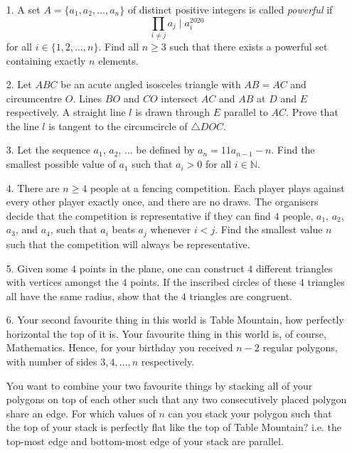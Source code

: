 \documentclass{article}
\begin{document}
\begin{enumerate}

\bigskip
\item[1.] %
A set $A = \{a_1, a_2, \dotsc, a_n\}$ of distinct positive integers is called \emph{powerful} if
\[ \prod_{i \neq j} a_j \mid a_i^{2020} \]
for all $i \in \{1, 2, \dotsc, n\}$.
Find all $n \ge 3$ such that there exists a powerful set containing exactly $n$ elements.


\medskip
\item[2.] %
Let $ABC$ be an acute angled isosceles triangle with $AB = AC$ and circumcentre $O$.
Lines $BO$ and $CO$ intersect $AC$ and $AB$ at $D$ and $E$ respectively.
A straight line $l$ is drawn through $E$ parallel to $AC$.
Prove that the line $l$ is tangent to the circumcircle of $\triangle DOC$.


\medskip
\item[3.] %
Let the sequence $a_1$, $a_2$, $\dotsc$ be defined by $a_n = 11 a_{n - 1} - n$.
Find the smallest possible value of $a_1$ such that $a_i > 0$ for all $i \in \mathbb{N}$.


\medskip
\item[4.] %
There are $n \ge 4$ people at a fencing competition.
Each player plays against every other player exactly once, and there are no draws.
The organisers decide that the competition is representative if they can find $4$ people, $a_1$, $a_2$, $a_3$, and $a_4$, such that $a_i$ beats $a_j$ whenever $i < j$.
Find the smallest value $n$ such that the competition will always be representative.


\medskip
\item[5.] %
Given some $4$ points in the plane, one can construct $4$ different triangles with vertices amongst the $4$ points.
If the inscribed circles of these $4$ triangles all have the same radius, show that the $4$ triangles are congruent. 


\medskip
\item[6.] %
Your second favourite thing in this world is Table Mountain, how perfectly horizontal the top of it is.
Your favourite thing in this world is, of course, Mathematics.
Hence, for your birthday you received $n-2$ regular polygons, with number of sides $3, 4, \dotsc, n$ respectively.

You want to combine your two favourite things by stacking all of your polygons on top of each other such that any two consecutively placed polygon share an edge.
For which values of $n$ can you stack your polygon such that the top of your stack is perfectly flat like the top of Table Mountain?
i.e. the top-most edge and bottom-most edge of your stack are parallel.



\end{enumerate}
\end{document}
